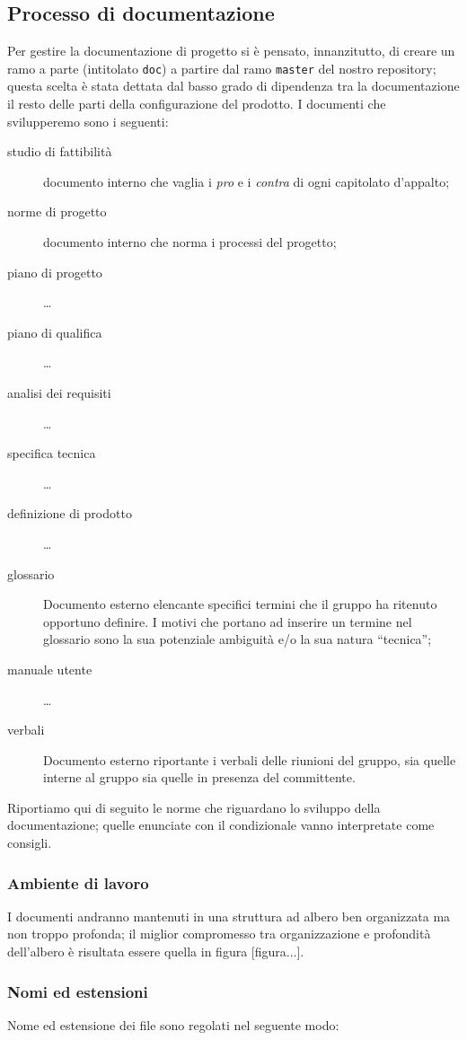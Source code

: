 \subsection{Processo di documentazione}
Per gestire la documentazione di progetto si è pensato, innanzitutto, di creare un ramo a parte (intitolato \texttt{doc}) a partire dal ramo \texttt{master} del nostro repository; questa scelta è stata dettata dal basso grado di dipendenza tra la documentazione il resto delle parti della configurazione del prodotto. I documenti che svilupperemo sono i seguenti:
\begin{description}
	\item[studio di fattibilità] documento interno che vaglia i \emph{pro} e i \emph{contra} di ogni capitolato d'appalto;
	\item[norme di progetto] documento interno che norma i processi del progetto;
	\item[piano di progetto] \dots
	\item[piano di qualifica] \dots
	\item[analisi dei requisiti] \dots
	\item[specifica tecnica] \dots
	\item[definizione di prodotto] \dots
	\item[glossario] Documento esterno elencante specifici termini che il gruppo ha ritenuto opportuno definire. I motivi che portano ad inserire un termine nel glossario sono la sua potenziale ambiguità e/o la sua natura “tecnica”;
	\item[manuale utente] \dots
	\item[verbali] Documento esterno riportante i verbali delle riunioni del gruppo, sia quelle interne al gruppo sia quelle in presenza del committente.
\end{description}
Riportiamo qui di seguito le norme che riguardano lo sviluppo della documentazione; quelle enunciate con il condizionale vanno interpretate come consigli.

\subsubsection{Ambiente di lavoro} I documenti andranno mantenuti in una struttura ad albero ben organizzata ma non troppo profonda; il miglior compromesso tra organizzazione e profondità dell'albero è risultata essere quella in figura [figura...].

\subsubsection{Nomi ed estensioni} Nome ed estensione dei file sono regolati nel seguente modo:
